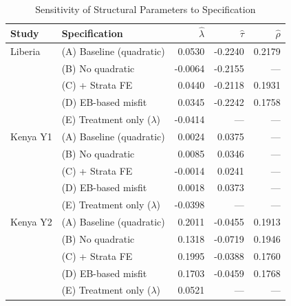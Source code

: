 \begin{table}[htbp]
\centering\small
\caption{Sensitivity of Structural Parameters to Specification}
\label{tab:calib_sensitivity}
\begin{tabular}{llrrr}
\toprule
Study & Specification & $\hat{\lambda}$ & $\hat{\tau}$ & $\hat{\rho}$ \\
\midrule
Liberia & (A) Baseline (quadratic) & 0.0530 & -0.2240 & 0.2179 \\
 & (B) No quadratic & -0.0064 & -0.2155 & --- \\
 & (C) + Strata FE & 0.0440 & -0.2118 & 0.1931 \\
 & (D) EB-based misfit & 0.0345 & -0.2242 & 0.1758 \\
 & (E) Treatment only ($\lambda$) & -0.0414 & --- & --- \\
\addlinespace
Kenya Y1 & (A) Baseline (quadratic) & 0.0024 & 0.0375 & --- \\
 & (B) No quadratic & 0.0085 & 0.0346 & --- \\
 & (C) + Strata FE & -0.0014 & 0.0241 & --- \\
 & (D) EB-based misfit & 0.0018 & 0.0373 & --- \\
 & (E) Treatment only ($\lambda$) & -0.0398 & --- & --- \\
\addlinespace
Kenya Y2 & (A) Baseline (quadratic) & 0.2011 & -0.0455 & 0.1913 \\
 & (B) No quadratic & 0.1318 & -0.0719 & 0.1946 \\
 & (C) + Strata FE & 0.1995 & -0.0388 & 0.1760 \\
 & (D) EB-based misfit & 0.1703 & -0.0459 & 0.1768 \\
 & (E) Treatment only ($\lambda$) & 0.0521 & --- & --- \\
\bottomrule
\end{tabular}
\par\smallskip{}
\end{table}